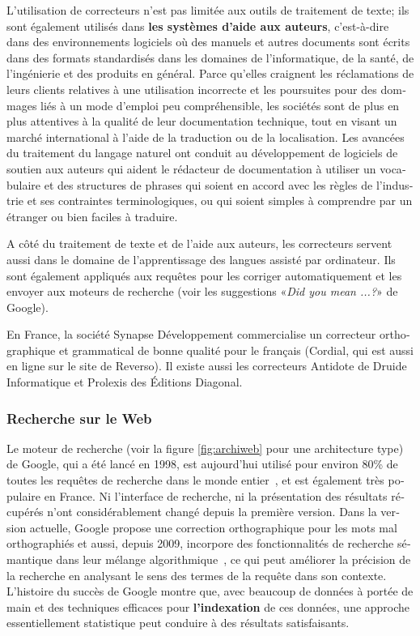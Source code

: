 \begin{french}
\begin{multicols}{2}
L'utilisation de correcteurs n'est pas limitée aux outils de
traitement de texte; ils sont également utilisés dans {\bf les systèmes
d'aide aux auteurs}, c'est-à-dire dans des environnements logiciels où
des manuels et autres documents sont écrits dans des formats
standardisés dans les domaines de l'informatique, de la santé, de
l'ingénierie et des produits en général. Parce qu'elles craignent les
réclamations de leurs clients relatives à une utilisation incorrecte
et les poursuites pour des dommages liés à un mode d'emploi peu
compréhensible, les sociétés sont de plus en plus attentives à la
qualité de leur documentation technique, tout en visant un marché
international à l'aide de la traduction ou de la localisation. Les
avancées du traitement du langage naturel ont conduit au développement
de logiciels de soutien aux auteurs qui aident le rédacteur de
documentation à utiliser un vocabulaire et des structures de phrases
qui soient en accord avec les règles de l'industrie et ses
contraintes terminologiques, ou qui soient simples à comprendre par un
étranger ou bien faciles à traduire.

A côté du traitement de texte et de l'aide aux auteurs, les
correcteurs servent aussi dans le domaine de l'apprentissage des
langues assisté par ordinateur. Ils sont également appliqués aux
requêtes pour les corriger automatiquement et les envoyer aux moteurs
de recherche (voir les suggestions «\textit{Did you mean ...?}» de
Google).

En France, la société Synapse Développement commercialise un
correcteur orthographique et grammatical de bonne qualité pour le
français (Cordial, qui est aussi en ligne sur le site de Reverso). Il
existe aussi les correcteurs Antidote de Druide Informatique et
Prolexis des Éditions Diagonal.

\subsubsection{Recherche sur le Web}
Le moteur de recherche (voir la figure \ref{fig:archiweb} pour une
architecture type) de Google, qui a été lancé en 1998, est aujourd'hui 
utilisé pour environ 80\% de toutes les requêtes de recherche
dans le monde entier~\cite{googleworld}, et est également très
populaire en France. Ni l'interface de recherche, ni la présentation
des résultats récupérés n'ont considérablement changé depuis la
première version. Dans la version actuelle, Google propose une
correction orthographique pour les mots mal orthographiés et aussi,
depuis 2009, incorpore des fonctionnalités de recherche sémantique
dans leur mélange algorithmique~\cite{googlesemantics}, ce qui peut
améliorer la précision de la recherche en analysant le sens des termes
de la requête dans son contexte. L'histoire du succès de Google montre
que, avec beaucoup de données à portée de main et des techniques
efficaces pour {\bf l'indexation} de ces données, une approche
essentiellement statistique peut conduire à des résultats
satisfaisants.


\end{multicols}
\end{french}
